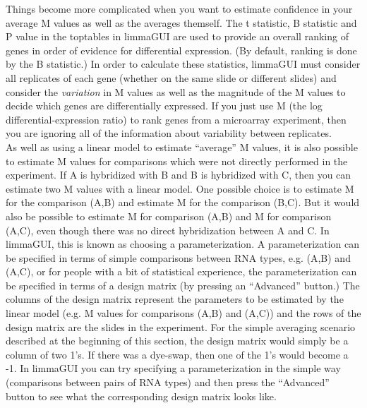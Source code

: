 \documentclass[a4paper,english,12pt]{article}
\begin{document}
Things become more complicated when you want to estimate confidence in your average M values as well as the
averages themself.  The t statistic, B statistic and P value in the toptables in limmaGUI are used 
to provide an overall ranking of genes in order of evidence for differential expression.  (By default, 
ranking is done by the B statistic.)  In order to calculate these statistics, limmaGUI must consider all
replicates of each gene (whether on the same slide or different slides) and consider the \emph{variation} in
M values as well as the magnitude of the M values to decide which genes are differentially expressed.  If you
just use M (the log differential-expression ratio) to rank genes from a microarray experiment, then you are
ignoring all of the information about variability between replicates.\\


As well as using a linear model to estimate ``average'' M values, it is also possible to estimate M values for 
comparisons which were not directly performed in the experiment.  If A is hybridized with B and
B is hybridized with C, then you can estimate two M values with a linear model.  One possible choice is to
estimate M for the comparison (A,B) and estimate M for the comparison (B,C).  But it would also be possible
to estimate M for comparison (A,B) and M for comparison (A,C), even though there was no direct hybridization
between A and C.  In limmaGUI, this is known as choosing a parameterization.  A parameterization can be
specified in terms of simple comparisons between RNA types, e.g. (A,B) and (A,C), or for people with a bit of
statistical experience, the parameterization can be specified in terms of a design matrix (by pressing an
``Advanced'' button.)  The columns of the design matrix represent the parameters to be estimated by the 
linear model (e.g. M values for comparisons (A,B) and (A,C)) and
the rows of the design matrix are the slides in the experiment.  For the simple averaging scenario described
at the beginning of this section, the design matrix would simply be a column of two 1's.  If there was a
dye-swap, then one of the 1's would become a -1.  In limmaGUI you can try specifying a parameterization in the 
simple way (comparisons between pairs of RNA types) and then press the ``Advanced'' button to see what the
corresponding design matrix looks like.
\end{document}
